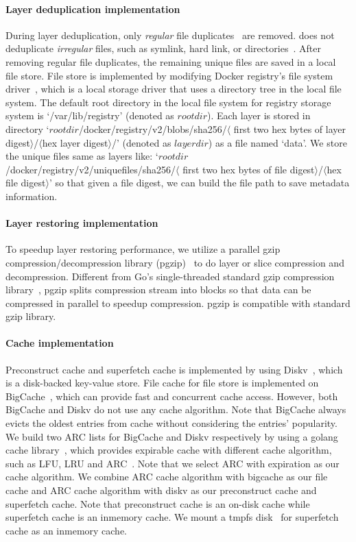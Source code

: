 \paragraph{Layer deduplication implementation}
During layer deduplication, only \emph{regular} file duplicates~\cite{xxx} are removed.
\sysname does not deduplicate \emph{irregular} files, such as symlink, hard link, or directories~\cite{xxx}.
After removing regular file duplicates, 
the remaining unique files are saved in a local file store.
File store is implemented by modifying Docker registry's file system driver~\cite{dockerfs}, 
which is a local storage driver 
that uses a directory tree in the local file system.
The default root directory in the local file system for registry storage system is `/var/lib/registry' (denoted as $rootdir$).
Each layer is stored in directory `$rootdir$/docker/registry/v2/blobs/sha256/$\langle$ first two hex bytes of layer digest$\rangle$/$\langle$hex layer digest$\rangle$/' (denoted as $layerdir$) as a file named `data'.
We store the unique files same as layers like: `$rootdir$/docker/registry/v2/uniquefiles/sha256/$\langle$ first two hex bytes of file digest$\rangle$/$\langle$hex file digest$\rangle$'
so that given a file digest, we can build the file path to save metadata information.

\paragraph{Layer restoring implementation}
To speedup layer restoring performance,
we utilize a parallel gzip compression/decompression library (pgzip)~\cite{pgzip} to do layer or slice compression and decompression.
Different from Go's single-threaded standard gzip compression library~\cite{gogzip},
pgzip splits compression stream into blocks so that data can be compressed in parallel to speedup compression.
pgzip is compatible with standard gzip library.

\paragraph{Cache implementation}

Preconstruct cache and 
superfetch cache is implemented by using Diskv~\cite{diskv}, which is a disk-backed key-value store.
File cache for file store
 is implemented on BigCache~\cite{bigcache}, which can provide fast and concurrent cache access.
However, both BigCache and Diskv do not use any cache algorithm. 
Note that BigCache always evicts the oldest entries from cache without considering the entries' popularity.
We build two ARC lists for BigCache and Diskv respectively by using a golang cache library~\cite{xxx}, 
which provides expirable cache with different cache algorithm, such as LFU, LRU and ARC~\cite{megiddo2003arc}.
Note that we select ARC with expiration as our cache algorithm.
We combine ARC cache algorithm with bigcache as our file cache
and ARC cache algorithm with diskv as our preconstruct cache and superfetch cache.
Note that preconstruct cache is an on-disk cache while superfetch cache is an inmemory cache.
We mount a tmpfs disk~\cite{xxx} for superfetch cache as an inmemory cache.

